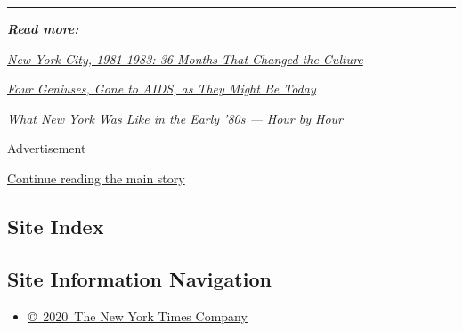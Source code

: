 \begin{center}\rule{0.5\linewidth}{\linethickness}\end{center}

\emph{\textbf{Read more:}}

\emph{\href{https://www.nytimes.com/interactive/2018/04/17/t-magazine/new-york-1980s-culture.html}{New
York City, 1981-1983: 36 Months That Changed the Culture}}

\emph{\href{https://www.nytimes.com/2018/04/19/t-magazine/keith-haring-tina-chow-aids-resurrected.html}{Four
Geniuses, Gone to AIDS, as They Might Be Today}}

\emph{\href{https://www.nytimes.com/2018/04/17/t-magazine/24-hours-new-york-city-1980s-life.html}{What
New York Was Like in the Early '80s --- Hour by Hour}}

Advertisement

\protect\hyperlink{after-bottom}{Continue reading the main story}

\hypertarget{site-index}{%
\subsection{Site Index}\label{site-index}}

\hypertarget{site-information-navigation}{%
\subsection{Site Information
Navigation}\label{site-information-navigation}}

\begin{itemize}
\tightlist
\item
  \href{https://help.nytimes.com/hc/en-us/articles/115014792127-Copyright-notice}{©~2020~The
  New York Times Company}
\end{itemize}

